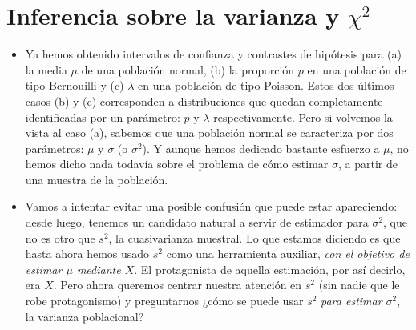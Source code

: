 
\section{Inferencia sobre la varianza y $\chi^2$}

\begin{itemize}

    \item Ya hemos obtenido intervalos de confianza y contrastes de hipótesis para (a) la media $\mu$ de una población normal, (b) la proporción $p$ en una población de tipo Bernouilli y (c) $\lambda$ en una población de tipo Poisson. Estos dos últimos casos (b) y (c) corresponden a distribuciones que quedan completamente identificadas por un parámetro: $p$ y $\lambda$ respectivamente. Pero si volvemos la vista al caso (a), sabemos que una población normal se caracteriza por dos parámetros: $\mu$ y $\sigma$ (o $\sigma^2$). Y aunque hemos dedicado bastante esfuerzo a $\mu$, no hemos dicho nada todavía sobre el problema de cómo estimar $\sigma$, a partir de una muestra de la población.

    \item Vamos a intentar evitar una posible confusión que puede estar apareciendo: desde luego, tenemos un {\sf candidato natural} a servir de estimador para $\sigma^2$, que no es otro que $s^2$, la {\sf cuasivarianza muestral}. Lo que estamos diciendo es que hasta ahora hemos usado $s^2$ como una herramienta auxiliar, {\em con el objetivo de estimar $\mu$ mediante $\bar X$}. El protagonista de aquella estimación, por así decirlo, era $\bar X$. Pero ahora queremos centrar nuestra atención en $s^2$ (sin nadie que le robe protagonismo) y preguntarnos ¿cómo se puede usar $s^2$ {\em para estimar $\sigma^2$}, la varianza poblacional?


\end{itemize}
